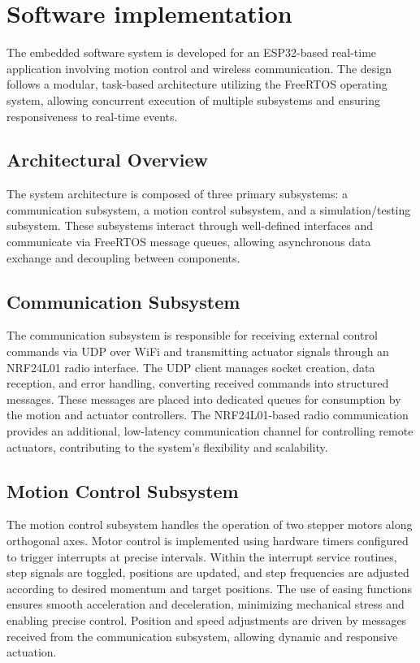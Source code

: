 \section{Software implementation}

The embedded software system is developed for an ESP32-based real-time application involving motion control and wireless communication. The design follows a modular, task-based architecture utilizing the FreeRTOS operating system, allowing concurrent execution of multiple subsystems and ensuring responsiveness to real-time events.

\subsection{Architectural Overview}
The system architecture is composed of three primary subsystems: a communication subsystem, a motion control subsystem, and a simulation/testing subsystem. These subsystems interact through well-defined interfaces and communicate via FreeRTOS message queues, allowing asynchronous data exchange and decoupling between components.

\subsection{Communication Subsystem}
The communication subsystem is responsible for receiving external control commands via UDP over WiFi and transmitting actuator signals through an NRF24L01 radio interface. The UDP client manages socket creation, data reception, and error handling, converting received commands into structured messages. These messages are placed into dedicated queues for consumption by the motion and actuator controllers. The NRF24L01-based radio communication provides an additional, low-latency communication channel for controlling remote actuators, contributing to the system's flexibility and scalability.

\subsection{Motion Control Subsystem}
The motion control subsystem handles the operation of two stepper motors along orthogonal axes. Motor control is implemented using hardware timers configured to trigger interrupts at precise intervals. Within the interrupt service routines, step signals are toggled, positions are updated, and step frequencies are adjusted according to desired momentum and target positions. The use of easing functions ensures smooth acceleration and deceleration, minimizing mechanical stress and enabling precise control. Position and speed adjustments are driven by messages received from the communication subsystem, allowing dynamic and responsive actuation.

